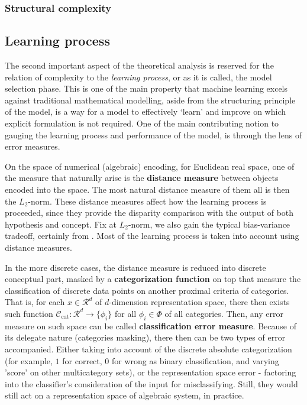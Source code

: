 \documentclass[10pt,oneside,oldfontcommands,dvipsnames,article]{memoir}
\begin{document}
\subsubsection{Structural complexity}



\subsection{Learning process}
The second important aspect of the theoretical analysis is reserved for the relation of complexity to the \textit{learning process}, or as it is called, the model selection phase. This is one of the main property that machine learning excels against traditional mathematical modelling, aside from the structuring principle of the model, is a way for a model to effectively `learn' and improve on which explicit formulation is not required. One of the main contributing notion to gauging the learning process and performance of the model, is through the lens of error measures. 

On the space of numerical (algebraic) encoding, for Euclidean real space, one of the measure that naturally arise is the \textbf{distance measure} between objects encoded into the space. The most natural distance measure of them all is then the $L_{2}$-norm. These distance measures affect how the learning process is proceeded, since they provide the disparity comparison with the output of both hypothesis and concept. Fix at $L_{2}$-norm, we also gain the typical bias-variance tradeoff, certainly from \cite{6797087}. Most of the learning process is taken into account using distance measures. 

In the more discrete cases, the distance measure is reduced into discrete conceptual part, masked by a \textbf{categorization function} on top that measure the classification of discrete data points on another proximal criteria of categories. That is, for each $x\in \mathcal{R}^{d}$ of $d$-dimension representation space, there then exists such function $\mathcal{C}_{\mathrm{cat}}: \mathcal{R}^{d}\to \{\phi_{i}\}$ for all $\phi_{i}\in \Phi$ of all categories. Then, any error measure on such space can be called \textbf{classification error measure}. Because of its delegate nature (categories masking), there then can be two types of error accompanied. Either taking into account of the discrete absolute categorization (for example, $1$ for correct, $0$ for wrong as binary classification, and varying 'score' on other multicategory sets), or the representation space error - factoring into the classifier's consideration of the input for misclassifying. Still, they would still act on a representation space of algebraic system, in practice. 
\end{document}
